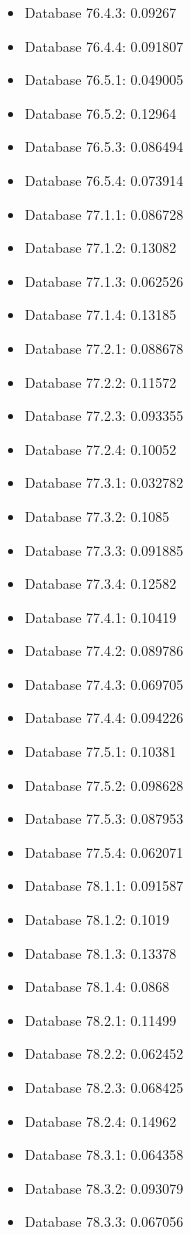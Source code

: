 \begin{itemize}
\item Database 76.4.3: 0.09267
\item Database 76.4.4: 0.091807
\item Database 76.5.1: 0.049005
\item Database 76.5.2: 0.12964
\item Database 76.5.3: 0.086494
\item Database 76.5.4: 0.073914
\item Database 77.1.1: 0.086728
\item Database 77.1.2: 0.13082
\item Database 77.1.3: 0.062526
\item Database 77.1.4: 0.13185
\item Database 77.2.1: 0.088678
\item Database 77.2.2: 0.11572
\item Database 77.2.3: 0.093355
\item Database 77.2.4: 0.10052
\item Database 77.3.1: 0.032782
\item Database 77.3.2: 0.1085
\item Database 77.3.3: 0.091885
\item Database 77.3.4: 0.12582
\item Database 77.4.1: 0.10419
\item Database 77.4.2: 0.089786
\item Database 77.4.3: 0.069705
\item Database 77.4.4: 0.094226
\item Database 77.5.1: 0.10381
\item Database 77.5.2: 0.098628
\item Database 77.5.3: 0.087953
\item Database 77.5.4: 0.062071
\item Database 78.1.1: 0.091587
\item Database 78.1.2: 0.1019
\item Database 78.1.3: 0.13378
\item Database 78.1.4: 0.0868
\item Database 78.2.1: 0.11499
\item Database 78.2.2: 0.062452
\item Database 78.2.3: 0.068425
\item Database 78.2.4: 0.14962
\item Database 78.3.1: 0.064358
\item Database 78.3.2: 0.093079
\item Database 78.3.3: 0.067056

\end{itemize}
